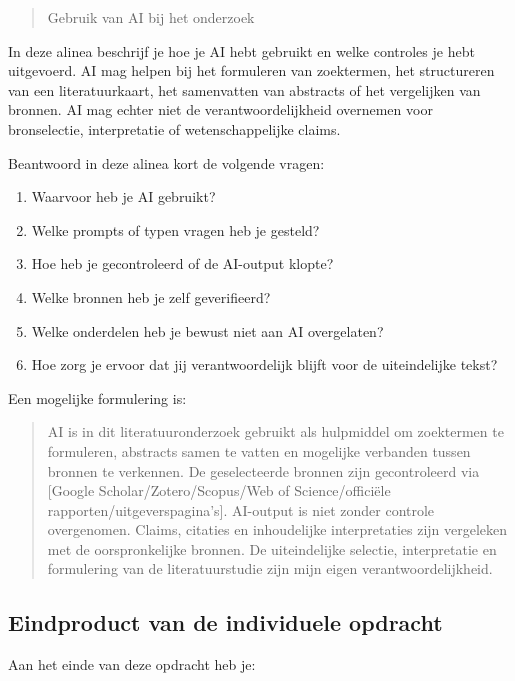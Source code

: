 \documentclass[
  letterpaper,
  DIV=11,
  numbers=noendperiod]{scrreprt}
\providecommand{\tightlist}{%
  \setlength{\itemsep}{0pt}\setlength{\parskip}{0pt}}
\begin{document}
\begin{quote}
Gebruik van AI bij het onderzoek
\end{quote}

In deze alinea beschrijf je hoe je AI hebt gebruikt en welke controles
je hebt uitgevoerd. AI mag helpen bij het formuleren van zoektermen, het
structureren van een literatuurkaart, het samenvatten van abstracts of
het vergelijken van bronnen. AI mag echter niet de verantwoordelijkheid
overnemen voor bronselectie, interpretatie of wetenschappelijke claims.

Beantwoord in deze alinea kort de volgende vragen:

\begin{enumerate}
\def\labelenumi{\arabic{enumi}.}
\tightlist
\item
  Waarvoor heb je AI gebruikt?
\item
  Welke prompts of typen vragen heb je gesteld?
\item
  Hoe heb je gecontroleerd of de AI-output klopte?
\item
  Welke bronnen heb je zelf geverifieerd?
\item
  Welke onderdelen heb je bewust niet aan AI overgelaten?
\item
  Hoe zorg je ervoor dat jij verantwoordelijk blijft voor de
  uiteindelijke tekst?
\end{enumerate}

Een mogelijke formulering is:

\begin{quote}
AI is in dit literatuuronderzoek gebruikt als hulpmiddel om zoektermen
te formuleren, abstracts samen te vatten en mogelijke verbanden tussen
bronnen te verkennen. De geselecteerde bronnen zijn gecontroleerd via
{[}Google Scholar/Zotero/Scopus/Web of Science/officiële
rapporten/uitgeverspagina's{]}. AI-output is niet zonder controle
overgenomen. Claims, citaties en inhoudelijke interpretaties zijn
vergeleken met de oorspronkelijke bronnen. De uiteindelijke selectie,
interpretatie en formulering van de literatuurstudie zijn mijn eigen
verantwoordelijkheid.
\end{quote}

\subsection{Eindproduct van de individuele
opdracht}\label{eindproduct-van-de-individuele-opdracht}

Aan het einde van deze opdracht heb je:
\end{document}
